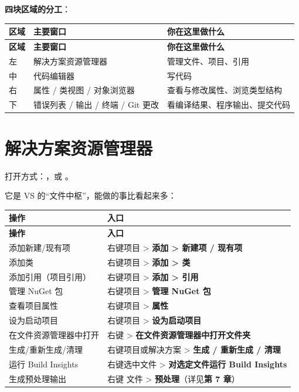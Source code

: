 \textbf{四块区域的分工}：

\begin{longtable}{L{2.2cm}L{5.2cm}L{7.2cm}}\toprule
\textbf{区域} & \textbf{主要窗口} & \textbf{你在这里做什么} \\ \midrule \endfirsthead
\toprule \textbf{区域} & \textbf{主要窗口} & \textbf{你在这里做什么} \\ \midrule \endhead
\bottomrule \endlastfoot
左 & 解决方案资源管理器 & 管理文件、项目、引用 \\
中 & 代码编辑器 & 写代码 \\
右 & 属性 / 类视图 / 对象浏览器 & 查看与修改属性、浏览类型结构 \\
下 & 错误列表 / 输出 / 终端 / Git 更改 & 看编译结果、程序输出、提交代码 \\
\end{longtable}

\section{解决方案资源管理器}

打开方式：，或 。

它是 VS 的“文件中枢”，能做的事比看起来多：

\begin{longtable}{L{6.4cm}L{8.6cm}}\toprule
\textbf{操作} & \textbf{入口} \\ \midrule \endfirsthead
\toprule \textbf{操作} & \textbf{入口} \\ \midrule \endhead
\bottomrule \endlastfoot
添加新建/现有项 & 右键项目 > \textbf{添加 > 新建项 / 现有项} \\
添加类 & 右键项目 > \textbf{添加 > 类} \\
添加引用（项目引用） & 右键项目 > \textbf{添加 > 引用} \\
管理 NuGet 包 & 右键项目 > \textbf{管理 NuGet 包} \\
查看项目属性 & 右键项目 > \textbf{属性} \\
设为启动项目 & 右键项目 > \textbf{设为启动项目} \\
在文件资源管理器中打开 & 右键 > \textbf{在文件资源管理器中打开文件夹} \\
生成/重新生成/清理 & 右键项目或解决方案 > \textbf{生成 / 重新生成 / 清理} \\
运行 Build Insights & 右键选中文件 > \textbf{对选定文件运行 Build Insights} \\
生成预处理输出 & 右键  文件 > \textbf{预处理}（详见\textbf{第 7 章}） \\
\end{longtable}


